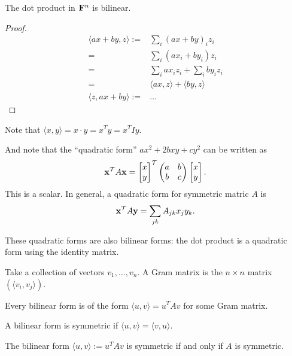 \begin{claim*}
  The dot product in $\mathbf{F}^n$ is bilinear.
\end{claim*}

\begin{proof}
  \begin{align*}
    \langle ax + by , z \rangle :=& \sum_i (ax + by)_iz_i\\
                                 =& \sum_i (ax_i + by_i)z_i\\
                                 =& \sum_i ax_iz_i + \sum_i by_iz_i\\
                                 =& \langle ax, z \rangle + \langle by, z \rangle\\
    \langle z, ax + by \rangle  :=& \ldots
  \end{align*}
\end{proof}

Note that $\langle x, y \rangle = x \cdot y = x^Ty = x^TIy$.

And note that the ``quadratic form'' $ax^2 + 2bxy + cy^2$ can be written as
\begin{align*}
\mathbf x^\mathcal T A \mathbf x = \begin{bmatrix}x\\y\end{bmatrix}^\mathcal T \begin{pmatrix}a & b\\b & c\\ \end{pmatrix} \begin{bmatrix}x\\y\end{bmatrix}.
\end{align*}
This is a scalar. In general, a quadratic form for symmetric matric $A$ is
\begin{align*}
\mathbf x^\mathcal T A \mathbf y = \sum_{jk}A_{jk}x_jy_k.
\end{align*}

These quadratic forms are also bilinear forms: the dot product is a quadratic form using the
identity matrix.

\begin{definition*}
  Take a collection of vectors $v_1, \ldots, v_n$. A Gram matrix is the $n \times n$ matrix
  $(\langle v_i, v_j \rangle)$.
\end{definition*}

\begin{theorem*}
  Every bilinear form is of the form $\langle u, v \rangle = u^TAv$ for some Gram matrix.
\end{theorem*}

\begin{definition*}
  A bilinear form is symmetric if $\langle u, v \rangle = \langle v, u \rangle$.
\end{definition*}

\begin{theorem*}
  The bilinear form $\langle u, v \rangle := u^TAv$ is symmetric if and only if $A$ is symmetric.
\end{theorem*}

